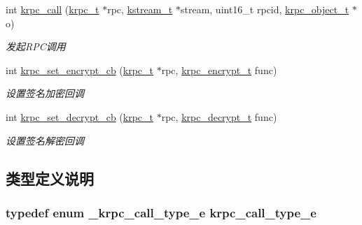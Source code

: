 \begin{DoxyCompactItemize}
int \hyperlink{a00093_a063313e66bd9a479b4d0a6295a5e665b_a063313e66bd9a479b4d0a6295a5e665b}{krpc\+\_\+call} (\hyperlink{a00056_a1e414ac6f6de24462ccf81e10f63428d_a1e414ac6f6de24462ccf81e10f63428d}{krpc\+\_\+t} $\ast$rpc, \hyperlink{a00056_acc208c4c40c875eebbfef88f00fffacf_acc208c4c40c875eebbfef88f00fffacf}{kstream\+\_\+t} $\ast$stream, uint16\+\_\+t rpcid, \hyperlink{a00056_a9c07dfc8c3b965f75b09f82fdb1bbb1e_a9c07dfc8c3b965f75b09f82fdb1bbb1e}{krpc\+\_\+object\+\_\+t} $\ast$o)
\begin{DoxyCompactList}\small\item\em 发起\+R\+P\+C调用 \end{DoxyCompactList}\item 
int \hyperlink{a00093_a5317bb571cb4d94bc56b83989c1b10c2_a5317bb571cb4d94bc56b83989c1b10c2}{krpc\+\_\+set\+\_\+encrypt\+\_\+cb} (\hyperlink{a00056_a1e414ac6f6de24462ccf81e10f63428d_a1e414ac6f6de24462ccf81e10f63428d}{krpc\+\_\+t} $\ast$rpc, \hyperlink{a00056_ae41a67cc07f8dff897ca978e03b1f2d7_ae41a67cc07f8dff897ca978e03b1f2d7}{krpc\+\_\+encrypt\+\_\+t} func)
\begin{DoxyCompactList}\small\item\em 设置签名加密回调 \end{DoxyCompactList}\item 
int \hyperlink{a00093_aa75ec66092e77639ca2cf2b5ad04c5db_aa75ec66092e77639ca2cf2b5ad04c5db}{krpc\+\_\+set\+\_\+decrypt\+\_\+cb} (\hyperlink{a00056_a1e414ac6f6de24462ccf81e10f63428d_a1e414ac6f6de24462ccf81e10f63428d}{krpc\+\_\+t} $\ast$rpc, \hyperlink{a00056_a5cf750f151c90f0589f68fe8c4421f1d_a5cf750f151c90f0589f68fe8c4421f1d}{krpc\+\_\+decrypt\+\_\+t} func)
\begin{DoxyCompactList}\small\item\em 设置签名解密回调 \end{DoxyCompactList}\end{DoxyCompactItemize}


\subsection{类型定义说明}
\hypertarget{a00093_aa7109e23eab2e74945868adf0b60132b_aa7109e23eab2e74945868adf0b60132b}{}
\subsubsection[{krpc\+\_\+call\+\_\+type\+\_\+e}]{\setlength{\rightskip}{0pt plus 5cm}typedef enum {\bf \+\_\+krpc\+\_\+call\+\_\+type\+\_\+e}  {\bf krpc\+\_\+call\+\_\+type\+\_\+e}}\label{a00093_aa7109e23eab2e74945868adf0b60132b_aa7109e23eab2e74945868adf0b60132b}
\hypertarget{a00093_aaadecef3a6bd120b41aee1916b5854d0_aaadecef3a6bd120b41aee1916b5854d0}{}
